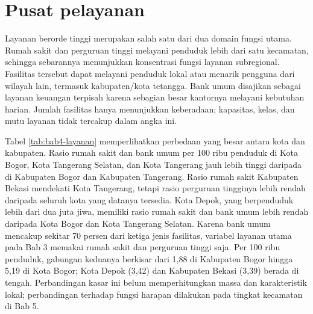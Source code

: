 \documentclass[12pt,a4paper,oneside,openany,indonesian]{report}
\begin{document}
\section{Pusat pelayanan}

Layanan berorde tinggi merupakan salah satu dari dua domain fungsi utama. Rumah sakit dan perguruan tinggi melayani penduduk lebih dari satu kecamatan, sehingga sebarannya menunjukkan konsentrasi fungsi layanan subregional. Fasilitas tersebut dapat melayani penduduk lokal atau menarik pengguna dari wilayah lain, termasuk kabupaten/kota tetangga. Bank umum disajikan sebagai layanan keuangan terpisah karena sebagian besar kantornya melayani kebutuhan harian. Jumlah fasilitas hanya menunjukkan keberadaan; kapasitas, kelas, dan mutu layanan tidak tercakup dalam angka ini.

Tabel \ref{tab:bab4-layanan} memperlihatkan perbedaan yang besar antara kota dan kabupaten. Rasio rumah sakit dan bank umum per 100 ribu penduduk di Kota Bogor, Kota Tangerang Selatan, dan Kota Tangerang jauh lebih tinggi daripada di Kabupaten Bogor dan Kabupaten Tangerang. Rasio rumah sakit Kabupaten Bekasi mendekati Kota Tangerang, tetapi rasio perguruan tingginya lebih rendah daripada seluruh kota yang datanya tersedia. Kota Depok, yang berpenduduk lebih dari dua juta jiwa, memiliki rasio rumah sakit dan bank umum lebih rendah daripada Kota Bogor dan Kota Tangerang Selatan. Karena bank umum mencakup sekitar 70 persen dari ketiga jenis fasilitas, variabel layanan utama pada Bab 3 memakai rumah sakit dan perguruan tinggi saja. Per 100 ribu penduduk, gabungan keduanya berkisar dari 1,88 di Kabupaten Bogor hingga 5,19 di Kota Bogor; Kota Depok (3,42) dan Kabupaten Bekasi (3,39) berada di tengah. Perbandingan kasar ini belum memperhitungkan massa dan karakteristik lokal; perbandingan terhadap fungsi harapan dilakukan pada tingkat kecamatan di Bab 5.
\end{document}
